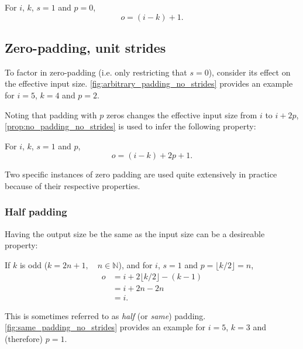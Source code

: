 \documentclass{article}
\begin{document}
\begin{prop}\label{prop:no_padding_no_strides}
For $i$, $k$, $s = 1$ and $p = 0$,
\begin{equation*}
    o = (i - k) + 1.
\end{equation*}
\end{prop}

\subsection{Zero-padding, unit strides}

To factor in zero-padding (i.e. only restricting that $s = 0$), consider its
effect on the effective input size. \autoref{fig:arbitrary_padding_no_strides}
provides an example for $i = 5$, $k = 4$ and $p = 2$.

Noting that padding with $p$ zeros changes the effective input size from $i$ to
$i + 2p$, \autoref{prop:no_padding_no_strides} is used to infer the following
property:

\begin{prop}\label{prop:arbitrary_padding_no_strides}
For $i$, $k$, $s = 1$ and $p$,
\begin{equation*}
    o = (i - k) + 2p + 1.
\end{equation*}
\end{prop}

Two specific instances of zero padding are used quite extensively in practice
because of their respective properties.

\subsubsection{Half padding}

Having the output size be the same as the input size can be a desireable
property:

\begin{prop}\label{prop:same_padding_no_strides}
If $k$ is odd ($k = 2n + 1, \quad n \in \mathbb{N}$), and for $i$, $s = 1$ and
$p = \lfloor k / 2 \rfloor = n$,
\begin{equation*}
\begin{split}
    o &= i + 2 \lfloor k / 2 \rfloor - (k - 1) \\
      &= i + 2n - 2n \\
      &= i.
\end{split}
\end{equation*}
\end{prop}

This is sometimes referred to as {\em half} (or {\em same}) padding.
\autoref{fig:same_padding_no_strides} provides an example for $i = 5$, $k = 3$
and (therefore) $p = 1$.
\end{document}
